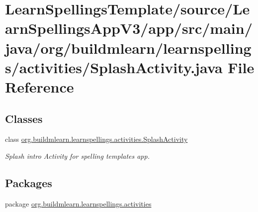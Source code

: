 \hypertarget{LearnSpellingsTemplate_2source_2LearnSpellingsAppV3_2app_2src_2main_2java_2org_2buildmlearn_2lea263cf1df93c4911292d418c475d08eab}{}\section{Learn\+Spellings\+Template/source/\+Learn\+Spellings\+App\+V3/app/src/main/java/org/buildmlearn/learnspellings/activities/\+Splash\+Activity.java File Reference}
\label{LearnSpellingsTemplate_2source_2LearnSpellingsAppV3_2app_2src_2main_2java_2org_2buildmlearn_2lea263cf1df93c4911292d418c475d08eab}
\subsection*{Classes}
\begin{DoxyCompactItemize}
\item 
class \hyperlink{classorg_1_1buildmlearn_1_1learnspellings_1_1activities_1_1SplashActivity}{org.\+buildmlearn.\+learnspellings.\+activities.\+Splash\+Activity}
\begin{DoxyCompactList}\small\item\em Splash intro Activity for spelling template\textquotesingle{}s app. \end{DoxyCompactList}\end{DoxyCompactItemize}
\subsection*{Packages}
\begin{DoxyCompactItemize}
\item 
package \hyperlink{namespaceorg_1_1buildmlearn_1_1learnspellings_1_1activities}{org.\+buildmlearn.\+learnspellings.\+activities}
\end{DoxyCompactItemize}
